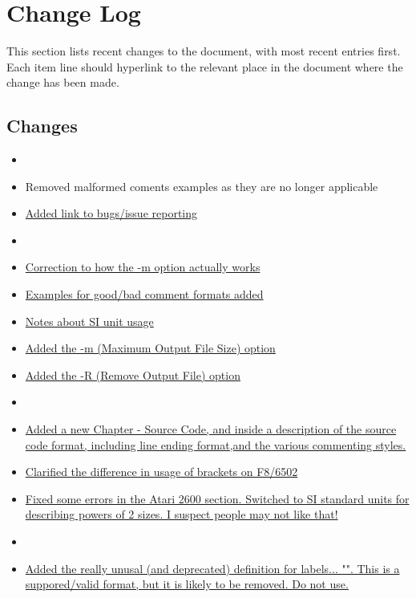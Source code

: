 \section*{Change Log}
\label{section:changelog}

This section lists recent changes to the document, with most recent entries first. Each item line should hyperlink to the relevant place in the document where the change has been made.

\subsection*{Changes}

\begin{itemize}

\item[]
\item Removed malformed coments examples as they are no longer applicable
\item \hyperref[changelog:20200913bugs]{Added link to bugs/issue reporting}

\item[]
\item \hyperref[changelog:20200908optionm]{Correction to how the -m option actually works}
\item \hyperref[changelog:20200909comment]{Examples for good/bad comment formats added}
\item \hyperref[changelog:20200909SI]{Notes about SI unit usage}
\item \hyperref[flag:maximum]{Added the -m (Maximum Output File Size) option}
\item \hyperref[flag:remove]{Added the -R (Remove Output File) option}

\item[]
\item \hyperref[changelog:20200908source]{Added a new Chapter - Source Code, and inside a description of the source code format, including line ending format,and  the various commenting styles.}
\item \hyperref[changelog:20200908brackets]{Clarified the difference in usage of brackets on F8/6502}
\item \hyperref[changelog:20200908atari]{Fixed some errors in the Atari 2600 section. Switched to SI standard units for describing powers of 2 sizes. I suspect people may not like that!}

\item[]
\item \hyperref[changelog:20200907deprecated]{Added the really unusal (and deprecated) definition for labels... "". This is a suppored/valid format, but it is likely to be removed. Do not use.}


\end{itemize}

